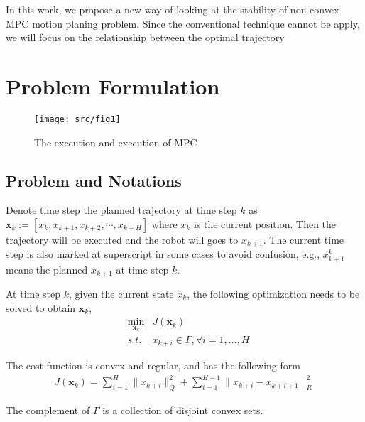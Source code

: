 \documentclass{ifacconf}
\begin{document}
In this work, we propose a new way of looking at the stability of non-convex MPC motion planing problem. Since the conventional technique cannot be apply, we will focus on the relationship between the optimal trajectory  






\section{Problem Formulation}

\begin{figure}[htbp]
\begin{center}
\texttt{[image: src/fig1]}
\caption{The execution and execution of MPC}
\label{fig: mpc}
\end{center}
\end{figure}

\subsection{Problem and Notations}
Denote time step the planned trajectory at time step $k$ as $\mathbf{x}_k:= [x_k, x_{k+1},x_{k+2},\cdots,x_{k+H}]$ where $x_k$ is the current position. Then the trajectory will be executed and the robot will goes to $x_{k+1}$. The current time step is also marked at superscript in some cases to avoid confusion, e.g., $x_{k+1}^k$ means the planned $x_{k+1}$ at time step $k$.

At time step $k$, given the current state $x_k$, the following optimization needs to be solved to obtain $\mathbf{x}_k$,
\begin{eqnarray}
&\min_{\mathbf{x}_{k}} & J(\mathbf{x}_k)\\
&s.t.& x_{k+i}\in\Gamma,\forall i=1,\ldots,H
\end{eqnarray}

\begin{assum}[Cost]
The cost function is convex and regular, and has the following form
\begin{eqnarray}
J(\mathbf{x}_k) = \sum_{i=1}^{H} \|x_{k+i}\|_{Q}^2 + \sum_{i=1}^{H-1} \|x_{k+i}-x_{k+i+1}\|_R^2
\end{eqnarray}
\end{assum}

\begin{assum}[Constraint]
The complement of $\Gamma$ is a collection of disjoint convex sets.
\end{assum}
\end{document}
